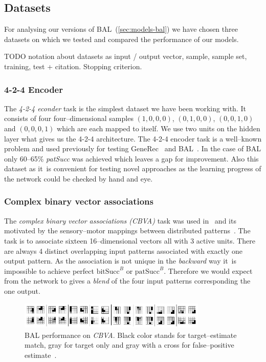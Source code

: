 
\subsection{Datasets}  
\label{sec:sim-data} 

For analysing our versions of BAL~(\ref{sec:models-bal}) we have chosen three datasets on which we tested and compared the performance of our models. 

TODO notation about datasets as input / output vector, sample, sample set, training, test + citation. Stopping criterion. 

\subsubsection{4-2-4 Encoder} 
\label{sec:datasets-auto4}


The \emph{4-2-4 econder} task is the simplest dataset we have been working with. It consists of four four--dimensional samples $(1,0,0,0)$, $(0,1,0,0)$, $(0,0,1,0)$ and $(0,0,0,1)$ which are each mapped to itself. We use two units on the hidden layer what gives us the 4-2-4 architecture. The 4-2-4 encoder task is a well--known problem and used previously for testing GeneRec~\citep{o1996bio} and BAL~\citep{farkas2013bal}. In the case of BAL only 60--65\% \emph{patSucc} was achieved which leaves a gap for improvement. Also this dataset as it~is convenient for testing novel approaches as the learning progress of the network could be checked by hand and eye. 

\subsubsection{Complex binary vector associations} 
\label{sec:datasets-k3}

The \emph{complex binary vector associations (CBVA)} task was used in~\citet{farkas2013bal} and its motivated by the sensory--motor mappings between distributed patterns~\citep{farkas2013bal}. The task is to associate sixteen 16--dimensional vectors all with 3 active units. There are always 4 distinct overlapping input patterns associated with exactly one output pattern. As the association is not unique in the \emph{backward} way it~is impossible to achieve perfect $\mbox{bitSucc}^B$ or $\mbox{patSucc}^B$. Therefore we would expect from the network to gives a \emph{blend} of the four input patterns corresponding the one output. 

\begin{figure}[H]
  \centering
  \includegraphics[width=0.8\textwidth]{img/datasets-k3.png} 
  \caption{BAL performance on \emph{CBVA}. Black color stands for target--estimate match, gray for target only and gray with a cross for false--positive estimate~\citep{farkas2013bal}.}
  \label{fig:datasets-k3}
\end{figure}

